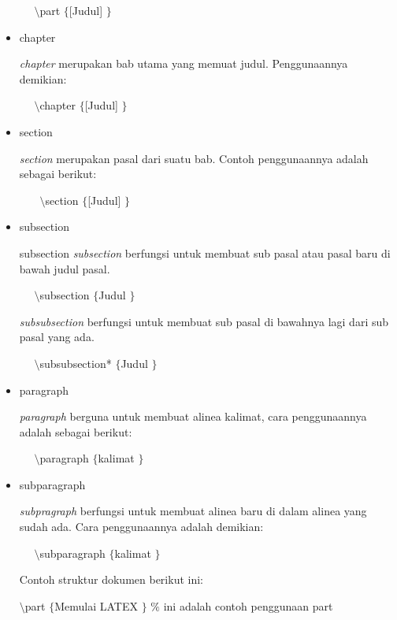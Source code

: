 \begin{itemize}
{\fontsize{10pt}{10pt}\selectfont ~~  $  \setminus  $part $  \{  $[Judul] $  \}  $}
 \par
\item chapter \par
\textit{chapter} merupakan bab utama yang memuat judul. Penggunaannya demikian:
\par
{\fontsize{10pt}{10pt}\selectfont ~~  $  \setminus  $chapter $  \{  $[Judul] $  \}  $}
\par
\item section \par
\textit{section} merupakan pasal dari suatu bab. Contoh penggunaannya adalah sebagai berikut:\
 \par
{\fontsize{10pt}{10pt}\selectfont ~~~  $  \setminus  $section $  \{  $[Judul] $  \}  $}
 \par
\item subsection \par
subsection \textit{subsection} berfungsi untuk membuat sub pasal atau pasal baru di bawah judul pasal.
 \par
{\fontsize{10pt}{10pt}\selectfont ~~  $  \setminus  $subsection $  \{  $Judul $  \}  $}
 \par
\textit{subsubsection} berfungsi untuk membuat sub pasal di bawahnya lagi dari sub pasal yang ada.
 \par
{\fontsize{10pt}{10pt}\selectfont ~~  $  \setminus  $subsubsection* $  \{  $Judul $  \}  $}
 \par
 \item paragraph \par
\textit{paragraph} berguna untuk membuat alinea kalimat, cara penggunaannya adalah sebagai berikut:
 \par
{\fontsize{10pt}{10pt}\selectfont ~~  $  \setminus  $paragraph $  \{  $kalimat $  \}  $}
 \par
\item subparagraph \par
\textit{subpragraph} berfungsi untuk membuat alinea baru di dalam alinea yang sudah ada. Cara penggunaannya adalah demikian:
 \par
{\fontsize{10pt}{10pt}\selectfont ~~  $  \setminus  $subparagraph $  \{  $kalimat $  \}  $}
 \par
 \vspace{12pt}
Contoh struktur dokumen berikut ini:
 \par
{\fontsize{10pt}{10pt}\selectfont  $  \setminus  $part $  \{  $Memulai LATEX $  \}  $  $  \%  $ ini adalah contoh penggunaan part}
 \par

\end{itemize}

